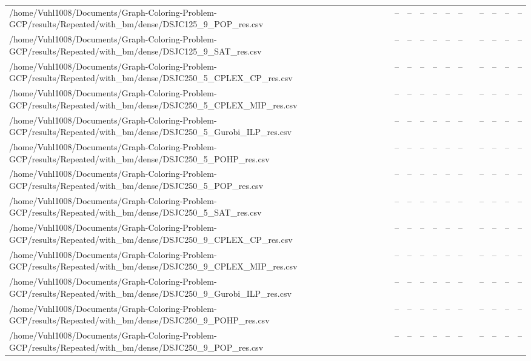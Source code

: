 \begin{table}[htbp]
\begin{tabular}{llllllllllll}
/home/Vuhl1008/Documents/Graph-Coloring-Problem-GCP/results/Repeated/with\_bm/dense/DSJC125\_9\_POP\_res.csv & -- & -- & -- & -- & -- & -- & {} & -- & -- & -- & -- \\
/home/Vuhl1008/Documents/Graph-Coloring-Problem-GCP/results/Repeated/with\_bm/dense/DSJC125\_9\_SAT\_res.csv & -- & -- & -- & -- & -- & -- & {} & -- & -- & -- & -- \\
/home/Vuhl1008/Documents/Graph-Coloring-Problem-GCP/results/Repeated/with\_bm/dense/DSJC250\_5\_CPLEX\_CP\_res.csv & -- & -- & -- & -- & -- & -- & {} & -- & -- & -- & -- \\
/home/Vuhl1008/Documents/Graph-Coloring-Problem-GCP/results/Repeated/with\_bm/dense/DSJC250\_5\_CPLEX\_MIP\_res.csv & -- & -- & -- & -- & -- & -- & {} & -- & -- & -- & -- \\
/home/Vuhl1008/Documents/Graph-Coloring-Problem-GCP/results/Repeated/with\_bm/dense/DSJC250\_5\_Gurobi\_ILP\_res.csv & -- & -- & -- & -- & -- & -- & {} & -- & -- & -- & -- \\
/home/Vuhl1008/Documents/Graph-Coloring-Problem-GCP/results/Repeated/with\_bm/dense/DSJC250\_5\_POHP\_res.csv & -- & -- & -- & -- & -- & -- & {} & -- & -- & -- & -- \\
/home/Vuhl1008/Documents/Graph-Coloring-Problem-GCP/results/Repeated/with\_bm/dense/DSJC250\_5\_POP\_res.csv & -- & -- & -- & -- & -- & -- & {} & -- & -- & -- & -- \\
/home/Vuhl1008/Documents/Graph-Coloring-Problem-GCP/results/Repeated/with\_bm/dense/DSJC250\_5\_SAT\_res.csv & -- & -- & -- & -- & -- & -- & {} & -- & -- & -- & -- \\
/home/Vuhl1008/Documents/Graph-Coloring-Problem-GCP/results/Repeated/with\_bm/dense/DSJC250\_9\_CPLEX\_CP\_res.csv & -- & -- & -- & -- & -- & -- & {} & -- & -- & -- & -- \\
/home/Vuhl1008/Documents/Graph-Coloring-Problem-GCP/results/Repeated/with\_bm/dense/DSJC250\_9\_CPLEX\_MIP\_res.csv & -- & -- & -- & -- & -- & -- & {} & -- & -- & -- & -- \\
/home/Vuhl1008/Documents/Graph-Coloring-Problem-GCP/results/Repeated/with\_bm/dense/DSJC250\_9\_Gurobi\_ILP\_res.csv & -- & -- & -- & -- & -- & -- & {} & -- & -- & -- & -- \\
/home/Vuhl1008/Documents/Graph-Coloring-Problem-GCP/results/Repeated/with\_bm/dense/DSJC250\_9\_POHP\_res.csv & -- & -- & -- & -- & -- & -- & {} & -- & -- & -- & -- \\
/home/Vuhl1008/Documents/Graph-Coloring-Problem-GCP/results/Repeated/with\_bm/dense/DSJC250\_9\_POP\_res.csv & -- & -- & -- & -- & -- & -- & {} & -- & -- & -- & -- \\

\end{tabular}
\end{table}
